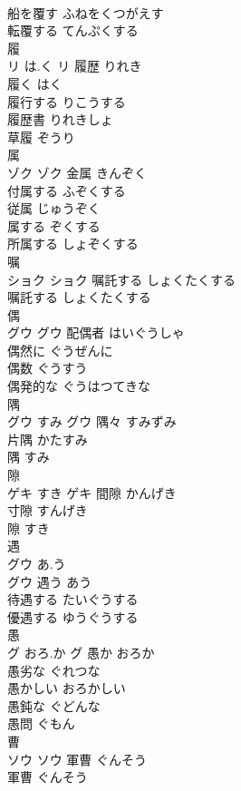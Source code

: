 \documentclass[8pt]{extreport}
\begin{document}
\begin{CJK}{UTF8}{min}
\\	船を覆す	ふねをくつがえす	
\\	転覆する	てんぷくする	
\\	履	
\\	リ	は.く	リ	履歴	りれき	
\\	履く	はく	
\\	履行する	りこうする	
\\	履歴書	りれきしょ	
\\	草履	ぞうり	
\\	属	
\\	ゾク		ゾク	金属	きんぞく	
\\	付属する	ふぞくする	
\\	従属	じゅうぞく	
\\	属する	ぞくする	
\\	所属する	しょぞくする	
\\	嘱	
\\	ショク		ショク	嘱託する	しょくたくする	
\\	嘱託する	しょくたくする	
\\	偶	
\\	グウ		グウ	配偶者	はいぐうしゃ	
\\	偶然に	ぐうぜんに	
\\	偶数	ぐうすう	
\\	偶発的な	ぐうはつてきな	
\\	隅	
\\	グウ	すみ	グウ	隅々	すみずみ	
\\	片隅	かたすみ	
\\	隅	すみ	
\\	隙	
\\	ゲキ	すき	ゲキ													間隙	かんげき	
\\	寸隙	すんげき	
\\	隙	すき	
\\	遇	
\\	グウ	あ.う
\\	グウ	遇う	あう	
\\	待遇する	たいぐうする	
\\	優遇する	ゆうぐうする	
\\	愚	
\\	グ	おろ.か	グ	愚か	おろか	
\\	愚劣な	ぐれつな	
\\	愚かしい	おろかしい	
\\	愚鈍な	ぐどんな	
\\	愚問	ぐもん	
\\	曹	
\\	ソウ		ソウ	軍曹	ぐんそう	
\\	軍曹	ぐんそう	

\end{CJK}
\end{document}

